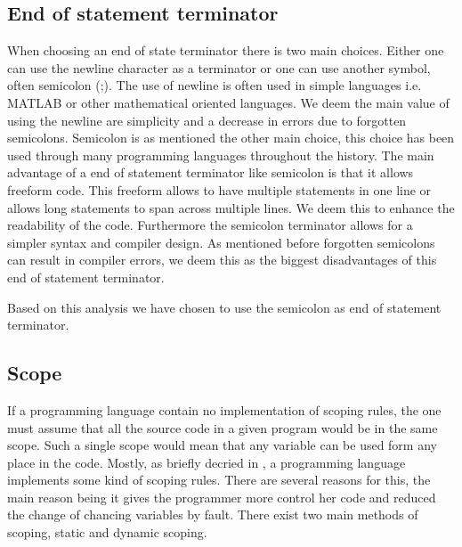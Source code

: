 \subsection*{End of statement terminator}
When choosing an end of state terminator there is two main choices.
Either one can use the newline character as a terminator or one can use another symbol, often semicolon (;).
The use of newline is often used in simple languages i.e. MATLAB or other mathematical oriented languages. 
We deem the main value of using the newline are simplicity and a decrease in errors due to forgotten semicolons.
Semicolon is as mentioned the other main choice, this choice has been used through many programming languages throughout the history. 
The main advantage of a end of statement terminator  like semicolon is that it allows freeform code. 
This freeform allows to have multiple statements in one line or allows long statements to span across multiple lines.
We deem this to enhance the readability of the code.
Furthermore the semicolon terminator allows for a simpler syntax and compiler design.
As mentioned before forgotten semicolons can result in compiler errors, we deem this as the biggest disadvantages of this end of statement terminator.

Based on this analysis we have chosen to use the semicolon as end of statement terminator.

\subsection*{Scope}
If a programming language contain no implementation of scoping rules, the one must assume that all the source code in a given program would be in the same scope.
Such a single scope would mean that any variable can be used form any place in the code. 
Mostly, as briefly decried in , a programming language implements some kind of scoping rules.
There are several reasons for this, the main reason being it gives the programmer more control her code and reduced the change of chancing variables by fault.
There exist two main methods of scoping, static and dynamic scoping.

